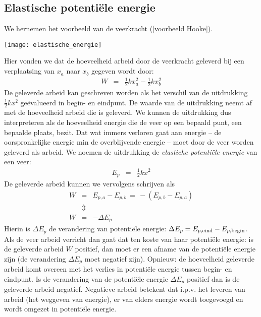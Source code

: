 \documentclass{ximera}
\begin{document}
	
	\subsection{Elastische potenti\"ele energie}\label{elastische
	potentiele energie}
	
	We hernemen het voorbeeld van de veerkracht (\ref{voorbeeld Hooke}).
	\begin{image}
	\texttt{[image: elastische\_energie]}
	\end{image}



	Hier vonden we dat de hoeveelheid arbeid door de veerkracht geleverd
	bij een verplaatsing van $x_a$ naar $x_b$ gegeven wordt door:
	\begin{eqnarray*}
	W&=&\frac{1}{2}kx_ a^2-\frac{1}{2}kx_ b^2
	\end{eqnarray*}
	De geleverde arbeid kan geschreven worden als het verschil van de uitdrukking $\frac{1}{2}kx^2$ ge\"evalueerd in begin- en eindpunt. De waarde van de uitdrukking neemt af met de hoeveelheid arbeid die is geleverd. We kunnen de uitdrukking dus interpreteren als de hoeveelheid energie die de veer op een bepaald punt, een bepaalde plaats, bezit. Dat wat immers verloren gaat aan energie -- de oorspronkelijke energie min de overblijvende energie -- moet door de veer worden geleverd als arbeid. We noemen de uitdrukking de \textit{elastiche potenti\"ele energie} van een veer:
	\begin{eqnarray}
	E_p&=&\frac{1}{2}kx^2
	\end{eqnarray}
	De geleverde arbeid kunnen we vervolgens schrijven als
	\begin{eqnarray*}
	W&=&E_{p,a}-E_{p,b}\,=\,-(E_{p,b}-E_{p,a})\\
	&\Updownarrow&\\
	W&=&-\Delta E_p
	\end{eqnarray*}
	Hierin is $\Delta E_p$ de verandering van potenti\"ele energie: $\Delta E_p=E_{p,\rm eind}-E_{p,\rm begin}$. Als de veer arbeid verricht dan gaat dat ten koste van haar potenti\"ele energie: is de geleverde arbeid $W$ positief, dan moet er een afname van de potenti\"ele energie zijn (de verandering $\Delta E_p$ moet negatief zijn). Opnieuw: de hoe\-veel\-heid geleverde arbeid komt overeen met het verlies in potenti\"ele energie tussen begin- en eindpunt. Is de verandering van de potenti\"ele energie $\Delta E_p$ positief dan is de geleverde arbeid negatief. Negatieve arbeid betekent dat i.p.v. het leveren van arbeid (het weggeven van energie), er van elders energie wordt toegevoegd en wordt omgezet in potenti\"ele energie.
	
\end{document}
